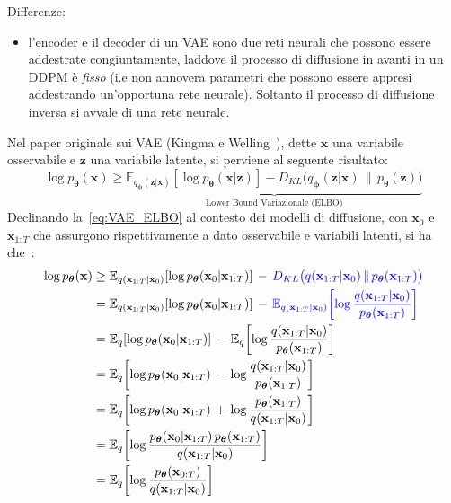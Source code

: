 \noindent Differenze:
\begin{itemize}
    \item l'encoder e il decoder di un VAE sono due reti neurali che possono essere addestrate congiuntamente, 
    laddove il processo di diffusione in avanti in un DDPM è \emph{fisso} 
    (i.e non annovera parametri che possono essere appresi addestrando un'opportuna rete neurale).
    Soltanto il processo di diffusione inversa si avvale di una rete neurale.
\end{itemize}
Nel paper originale sui VAE (Kingma e Welling~\cite{kingmaVAE2022}), dette $\mathbf{x}$ una variabile osservabile e $\mathbf{z}$ una variabile latente, 
si perviene al seguente risultato:
\begin{equation}
\log p_{\bm{\theta}}(\mathbf{x})\geq \underbrace{\mathbb{E}_{q_{\bm{\phi}}(\mathbf{z}|\mathbf{x})}[\log p_{\bm{\theta}}(\mathbf{x}|\mathbf{z})]
-D_{KL}\bigl(q_{\bm{\phi}}(\mathbf{z}|\mathbf{x})\,\|\,p_{\bm{\theta}}(\mathbf{z})\bigr)}_{\text{Lower Bound Variazionale (ELBO)}} \label{eq:VAE_ELBO}
\end{equation}
Declinando la~\eqref{eq:VAE_ELBO} al contesto dei modelli di diffusione, con $\mathbf{x}_0$ e $\mathbf{x}_{1:T}$ che assurgono rispettivamente a 
dato osservabile e variabili latenti, si ha che~\cite{nain2022}:
\begin{align}
    \log p_{\bm{\theta}}(\mathbf{x})
    &\geq \mathbb{E}_{q(\mathbf{x}_{1:T}|\mathbf{x}_0)}[\log p_{\bm{\theta}}(\mathbf{x}_0|\mathbf{x}_{1:T})]\,-\,
    \mathcolor{blue}{D_{KL}\bigl(q(\mathbf{x}_{1:T}|\mathbf{x}_0)\,\|\,p_{\bm{\theta}}(\mathbf{x}_{1:T})\bigr)} \label{eq:elbo1}\\
    &= \mathbb{E}_{q(\mathbf{x}_{1:T}|\mathbf{x}_0)}[\log p_{\bm{\theta}}(\mathbf{x}_0|\mathbf{x}_{1:T})]\,-
    \,\mathcolor{blue}{\mathbb{E}_{q(\mathbf{x}_{1:T}|\mathbf{x}_0)}\biggl[\log\frac{q(\mathbf{x}_{1:T}|\mathbf{x}_0)}{p_{\bm{\theta}}(\mathbf{x}_{1:T})}\biggr]}\label{eq:elbo2}\\
    &= \mathbb{E}_q[\log p_{\bm{\theta}}(\mathbf{x}_0|\mathbf{x}_{1:T})]\,-\,\mathbb{E}_q\biggl[\log\frac{q(\mathbf{x}_{1:T}|\mathbf{x}_0)}{p_{\bm{\theta}}(\mathbf{x}_{1:T})}\biggr]\label{eq:elbo3}\\
    &=\mathbb{E}_q\biggl[\log p_{\bm{\theta}}(\mathbf{x}_0|\mathbf{x}_{1:T})\,-\,\log\frac{q(\mathbf{x}_{1:T}|\mathbf{x}_0)}{p_{\bm{\theta}}(\mathbf{x}_{1:T})}\biggr]\label{eq:elbo4}\\
    &= \mathbb{E}_q\biggl[\log p_{\bm{\theta}}(\mathbf{x}_0|\mathbf{x}_{1:T})\,+\,\log\frac{p_{\bm{\theta}}(\mathbf{x}_{1:T})}{q(\mathbf{x}_{1:T}|\mathbf{x}_0)}\biggr]\\
    &=\mathbb{E}_q\biggl[\log\frac{p_{\bm{\theta}}(\mathbf{x}_0|\mathbf{x}_{1:T})\,p_{\bm{\theta}}(\mathbf{x}_{1:T})}{q(\mathbf{x}_{1:T}|\mathbf{x}_0)}\biggr]\\
    &= \mathbb{E}_q\biggl[\log\frac{p_{\bm{\theta}}(\mathbf{x}_{0:T})}{q(\mathbf{x}_{1:T}|\mathbf{x}_0)}\biggr]
\end{align}

